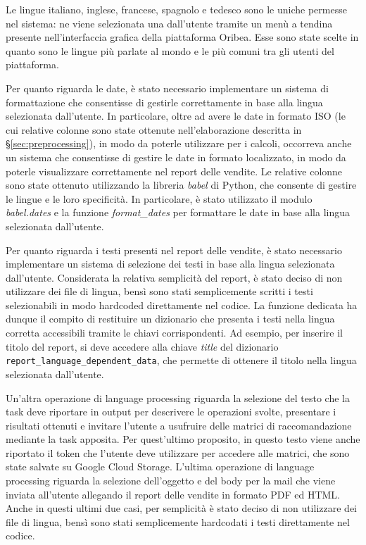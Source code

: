 Le lingue italiano, inglese, francese, spagnolo e tedesco sono le uniche permesse nel sistema: ne viene selezionata una dall'utente tramite un menù a tendina presente nell'interfaccia grafica della piattaforma Oribea. Esse sono state scelte in quanto sono le lingue più parlate al mondo e le più comuni tra gli utenti del piattaforma.

Per quanto riguarda le date, è stato necessario implementare un sistema di formattazione che consentisse di gestirle correttamente in base alla lingua selezionata dall'utente. In particolare, oltre ad avere le date in formato ISO (le cui relative colonne sono state ottenute nell'elaborazione descritta in \S\ref{sec:preprocessing}), in modo da poterle utilizzare per i calcoli, occorreva anche un sistema che consentisse di gestire le date in formato localizzato, in modo da poterle visualizzare correttamente nel report delle vendite.
Le relative colonne sono state ottenuto utilizzando la libreria \emph{babel} di Python, che consente di gestire le lingue e le loro specificità. In particolare, è stato utilizzato il modulo \emph{babel.dates} e la funzione \emph{format\_dates} per formattare le date in base alla lingua selezionata dall'utente.

Per quanto riguarda i testi presenti nel report delle vendite, è stato necessario implementare un sistema di selezione dei testi in base alla lingua selezionata dall'utente. Considerata la relativa semplicità del report, è stato deciso di non utilizzare dei file di lingua, bensì sono stati semplicemente scritti i testi selezionabili in modo \gls{hardcoded} direttamente nel codice.
La funzione dedicata ha dunque il compito di restituire un dizionario che presenta i testi nella lingua corretta accessibili tramite le chiavi corrispondenti. Ad esempio, per inserire il titolo del report, si deve accedere alla chiave \emph{title} del dizionario \texttt{report\_language\_dependent\_data}, che permette di ottenere il titolo nella lingua selezionata dall'utente.

Un'altra operazione di language processing riguarda la selezione del testo che la task deve riportare in output per descrivere le operazioni svolte, presentare i risultati ottenuti e invitare l'utente a usufruire delle matrici di raccomandazione mediante la task apposita. Per quest'ultimo proposito, in questo testo viene anche riportato il token che l'utente deve utilizzare per accedere alle matrici, che sono state salvate su Google Cloud Storage.
L'ultima operazione di language processing riguarda la selezione dell'oggetto e del body per la mail che viene inviata all'utente allegando il report delle vendite in formato PDF ed HTML.
Anche in questi ultimi due casi, per semplicità è stato deciso di non utilizzare dei file di lingua, bensì sono stati semplicemente hardcodati i testi direttamente nel codice.



